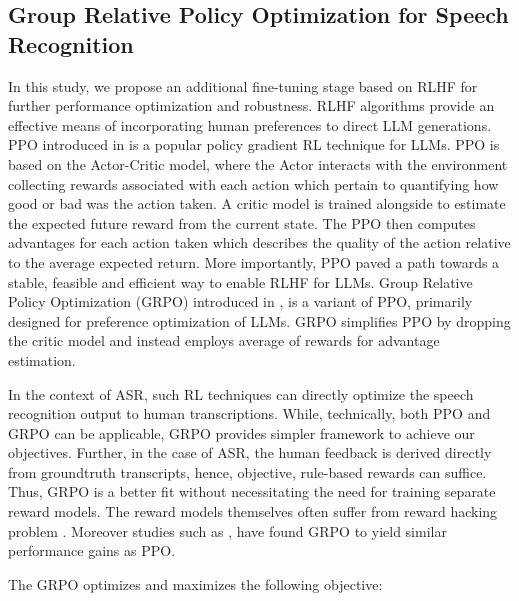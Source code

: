 \documentclass[conference]{IEEEtran}
\newcommand\numberthis{\addtocounter{equation}{1}\tag{\theequation}}
\begin{document}
\subsection{Group Relative Policy Optimization for Speech Recognition}
In this study, we propose an additional fine-tuning stage based on RLHF for further performance optimization and robustness.
RLHF algorithms provide an effective means of incorporating human preferences to direct LLM generations.
PPO introduced in \cite{schulman2017proximal} is a popular policy gradient RL technique for LLMs.
PPO is based on the Actor-Critic model, where the Actor interacts with the environment collecting rewards associated with each action which pertain to quantifying how good or bad was the action taken.
A critic model is trained alongside to estimate the expected future reward from the current state.
The PPO then computes advantages for each action taken which describes the quality of the action relative to the average expected return.
More importantly, PPO paved a path towards a stable, feasible and efficient way to enable RLHF for LLMs.
Group Relative Policy Optimization (GRPO) introduced in \cite{shao2024deepseekmath}, is a variant of PPO, primarily designed for preference optimization of LLMs.
GRPO simplifies PPO by dropping the critic model and instead employs average of rewards for advantage estimation.

In the context of ASR, such RL techniques can directly optimize the speech recognition output to human transcriptions.
While, technically, both PPO and GRPO can be applicable, GRPO provides simpler framework to achieve our objectives.
Further, in the case of ASR, the human feedback is derived directly from groundtruth transcripts, hence, objective, rule-based rewards can suffice.
Thus, GRPO is a better fit without necessitating the need for training separate reward models.
The reward models themselves often suffer from reward hacking problem \cite{everitt2017reinforcement}.
Moreover studies such as \cite{shao2024deepseekmath}, have found GRPO to yield similar performance gains as PPO.

The GRPO optimizes and maximizes the following objective:
\resizebox{\linewidth}{!}{
\begin{minipage}{\linewidth}
\begin{align*}
L_{\scriptscriptstyle{GRPO}}=\frac{1}{G} \sum_{i=1}^G \frac{1}{|o_i|}\sum_{t=1}^{|o_i|} min[\pi_{\vartheta} \hat{A}_{i,t}, & clip(\pi_{\vartheta}, 1-\varepsilon, 1+\varepsilon]) \hat{A}_{i,t}] \\& - \beta \mathbb{D}_{KL}[\pi_{\theta}||\pi_{ref}] \numberthis \label{equation:loss}
\end{align*}
\end{minipage}
}
\end{document}
